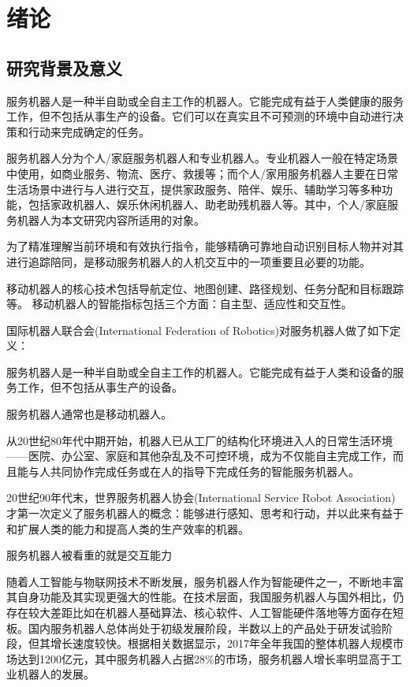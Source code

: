
\chapter{绪论}

\section{研究背景及意义}

  服务机器人是一种半自助或全自主工作的机器人。它能完成有益于人类健康的服务工作，但不包括从事生产的设备。它们可以在真实且不可预测的环境中自动进行决策和行动来完成确定的任务。

服务机器人分为个人/家庭服务机器人和专业机器人。专业机器人一般在特定场景中使用，如商业服务、物流、医疗、救援等；而个人/家用服务机器人主要在日常生活场景中进行与人进行交互，提供家政服务、陪伴、娱乐、辅助学习等多种功能，包括家政机器人、娱乐休闲机器人、助老助残机器人等。其中，个人/家庭服务机器人为本文研究内容所适用的对象。

  为了精准理解当前环境和有效执行指令，能够精确可靠地自动识别目标人物并对其进行追踪陪同，是移动服务机器人的人机交互中的一项重要且必要的功能。

  移动机器人的核心技术包括导航定位、地图创建、路径规划、任务分配和目标跟踪等。
  移动机器人的智能指标包括三个方面：自主型、适应性和交互性。

  国际机器人联合会(International Federation of Robotics)对服务机器人做了如下定义：

  服务机器人是一种半自助或全自主工作的机器人。它能完成有益于人类和设备的服务工作，但不包括从事生产的设备。

  服务机器人通常也是移动机器人。

  从20世纪80年代中期开始，机器人已从工厂的结构化环境进入人的日常生活环境——医院、办公室、家庭和其他杂乱及不可控环境，成为不仅能自主完成工作，而且能与人共同协作完成任务或在人的指导下完成任务的智能服务机器人。

  20世纪90年代末，世界服务机器人协会(International Service Robot Association)才第一次定义了服务机器人的概念：能够进行感知、思考和行动，并以此来有益于和扩展人类的能力和提高人类的生产效率的机器。

  服务机器人被看重的就是交互能力

  随着人工智能与物联网技术不断发展，服务机器人作为智能硬件之一，不断地丰富其自身功能及其实现更强大的性能。在技术层面，我国服务机器人与国外相比，仍存在较大差距比如在机器人基础算法、核心软件、人工智能硬件落地等方面存在短板。国内服务机器人总体尚处于初级发展阶段，半数以上的产品处于研发试验阶段，但其增长速度较快。根据相关数据显示，2017年全年我国的整体机器人规模市场达到1200亿元，其中服务机器人占据28\%的市场，服务机器人增长率明显高于工业机器人的发展。

